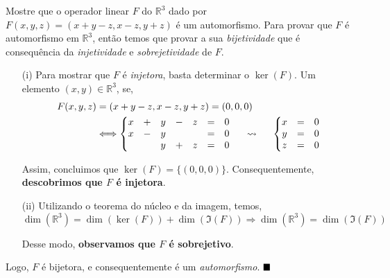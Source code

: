 \begin{solutionitem}[a]{Mostre que o operador linear $F$ do $\mathbb{R}^3$ dado por $F(x, y, z) = (x + y - z, x - z, y + z)$ é um automorfismo.}
    Para provar que $F$ é automorfismo em $\mathbb{R}^3$, então temos que provar a sua \textit{bijetividade} que é consequência da \textit{injetividade} e \textit{sobrejetividade} de $F$.
        \begin{enumerate}
            \item[(i)] Para mostrar que $F$ é \textit{injetora}, basta determinar o $\ker(F)$. Um elemento $(x,y) \in \mathbb{R}^3$, se,
            \begin{align*}
                F(x, y, z) &= (x + y - z, x - z, y + z) = (0, 0, 0) \\
                &\Longleftrightarrow 
            \left\{
                \begin{matrix}
                    x & + & y & - & z & = & 0 \\
                    x & - & y &   &   & = & 0 \\
                      &   & y & + & z & = & 0 \\
                \end{matrix}
            \right.
            \hspace{0.5cm}\rightsquigarrow\hspace{0.5cm}
            \left\{
                \begin{matrix}
                    x & = & 0 \\
                    y & = & 0 \\
                    z & = & 0 \\
                \end{matrix}
            \right.
            \end{align*}

            Assim, concluimos que $\ker(F) = \{(0, 0, 0)\}$. Consequentemente, \textbf{descobrimos que $F$ é injetora}.

        \item[(ii)] Utilizando o teorema do núcleo e da imagem, temos,
        \[ 
        \dim(\mathbb{R}^3) = \dim(\ker(F)) + \dim(\Im(F)) \Longrightarrow \dim(\mathbb{R}^3) = \dim(\Im(F))
        \]

        Desse modo, \textbf{observamos que $F$ é sobrejetivo}.
        \end{enumerate}
        Logo, $F$ é bijetora, e consequentemente é um \textit{automorfismo}. $\hfill{\blacksquare}$
\end{solutionitem}